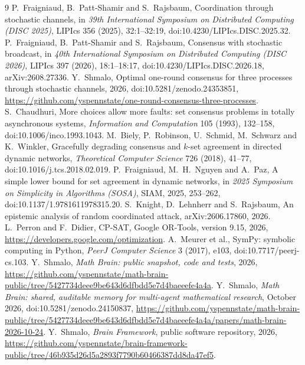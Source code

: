 \documentclass[11pt]{article}
\theoremstyle{remark}
\begin{document}
\begin{thebibliography}{9}
 P.~Fraigniaud, B.~Patt-Shamir and S.~Rajsbaum, Coordination through stochastic channels, in \emph{39th International Symposium on Distributed Computing (DISC 2025)}, LIPIcs 356 (2025), 32:1--32:19, doi:10.4230/LIPIcs.DISC.2025.32.
 P.~Fraigniaud, B.~Patt-Shamir and S.~Rajsbaum, Consensus with stochastic broadcast, in \emph{40th International Symposium on Distributed Computing (DISC 2026)}, LIPIcs 397 (2026), 18:1--18:17, doi:10.4230/LIPIcs.DISC.2026.18, arXiv:2608.27336.
 Y.~Shmalo, Optimal one-round consensus for three processes through stochastic channels, 2026, doi:10.5281/zenodo.24353851, \url{https://github.com/yspennstate/one-round-consensus-three-processes}.
 S.~Chaudhuri, More choices allow more faults: set consensus problems in totally asynchronous systems, \emph{Information and Computation} 105 (1993), 132--158, doi:10.1006/inco.1993.1043.
 M.~Biely, P.~Robinson, U.~Schmid, M.~Schwarz and K.~Winkler, Gracefully degrading consensus and $k$-set agreement in directed dynamic networks, \emph{Theoretical Computer Science} 726 (2018), 41--77, doi:10.1016/j.tcs.2018.02.019.
 P.~Fraigniaud, M.~H.~Nguyen and A.~Paz, A simple lower bound for set agreement in dynamic networks, in \emph{2025 Symposium on Simplicity in Algorithms (SOSA)}, SIAM, 2025, 253--262, doi:10.1137/1.9781611978315.20.
 S.~Knight, D.~Lehnherr and S.~Rajsbaum, An epistemic analysis of random coordinated attack, arXiv:2606.17860, 2026.
 L.~Perron and F.~Didier, CP-SAT, Google OR-Tools, version 9.15, 2026, \url{https://developers.google.com/optimization}.
 A.~Meurer et al., SymPy: symbolic computing in Python, \emph{PeerJ Computer Science} 3 (2017), e103, doi:10.7717/peerj-cs.103.
 Y.~Shmalo, \emph{Math Brain: public snapshot, code and tests}, 2026, \url{https://github.com/yspennstate/math-brain-public/tree/5427734deee9be643d6dfbdd5e7d4baeeefe4a4a}.
 Y.~Shmalo, \emph{Math Brain: shared, auditable memory for multi-agent mathematical research}, October 2026, doi:10.5281/zenodo.24150837, \url{https://github.com/yspennstate/math-brain-public/tree/5427734deee9be643d6dfbdd5e7d4baeeefe4a4a/papers/math-brain-2026-10-24}.
 Y.~Shmalo, \emph{Brain Framework}, public software repository, 2026, \url{https://github.com/yspennstate/brain-framework-public/tree/46b935d26d5a2893f7790b60466387dd8da47ef5}.
\end{thebibliography}
\end{document}
